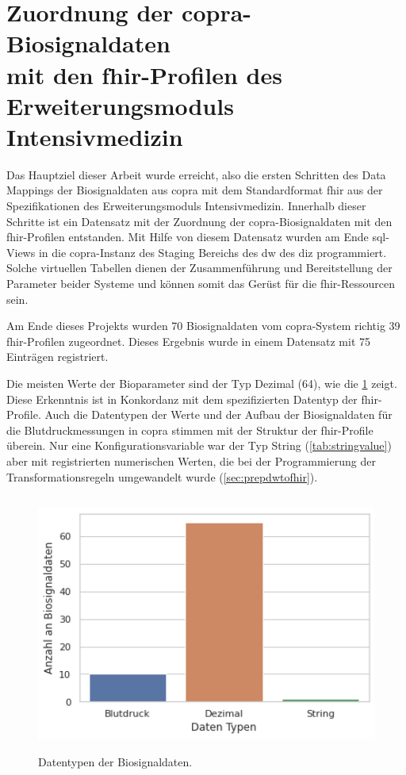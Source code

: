 \section[Zuordnung der \acs{copra}-Biosignaldaten mit den \acs{fhir}-Profilen des Erweiterungsmoduls \glqq Intensivmedizin\grqq{}]{Zuordnung der \acs{copra}-Biosignaldaten \\ mit den \acs{fhir}-Profilen des Erweiterungsmoduls \glqq Intensivmedizin\grqq{}} \label{sect:resdatamapping}

Das Hauptziel dieser Arbeit wurde erreicht, also die ersten Schritten des Data Mappings der Biosignaldaten aus \ac{copra} mit dem Standardformat \ac{fhir} aus der Spezifikationen des Erweiterungsmoduls \glqq Intensivmedizin\grqq{}. Innerhalb dieser Schritte ist ein Datensatz mit der Zuordnung der \ac{copra}-Biosignaldaten mit den \ac{fhir}-Profilen entstanden. Mit Hilfe von diesem Datensatz wurden am Ende \ac{sql}-Views in die \ac{copra}-Instanz des Staging Bereichs des \ac{dw} des \ac{diz} programmiert. Solche virtuellen Tabellen dienen der Zusammenführung und Bereitstellung der Parameter beider Systeme und können somit das Gerüst für die \ac{fhir}-Ressourcen sein.

Am Ende dieses Projekts wurden 70 Biosignaldaten vom \ac{copra}-System richtig 39 \ac{fhir}-Profilen zugeordnet. Dieses Ergebnis wurde in einem Datensatz mit 75 Einträgen registriert.

Die meisten Werte der Bioparameter sind der Typ Dezimal (64), wie die \ref{fig:signaldatatyps} zeigt. Diese Erkenntnis ist in Konkordanz mit dem spezifizierten Datentyp der \ac{fhir}-Profile. Auch die Datentypen der Werte und der Aufbau der Biosignaldaten für die Blutdruckmessungen in \ac{copra} stimmen mit der Struktur der \ac{fhir}-Profile überein. Nur eine Konfigurationsvariable war der Typ String (\ref{tab:stringvalue}) aber mit registrierten numerischen Werten, die bei der Programmierung der Transformationsregeln umgewandelt wurde (\ref{sec:prepdwtofhir}).

\begin{figure}[ht]
	\centering
	\includegraphics[height=8.5cm]{figures/biosignal_data_types}
	\caption[Datentypen der Biosignaldaten]{Datentypen der Biosignaldaten.}
	\label{fig:signaldatatyps}
\end{figure}

